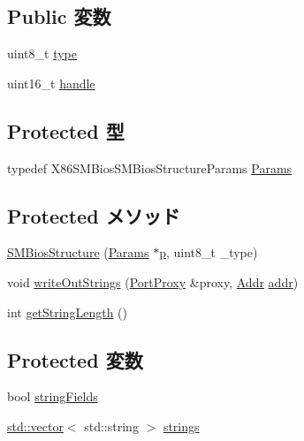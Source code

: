 \subsection*{Public 変数}
\begin{DoxyCompactItemize}
\item 
uint8\_\-t \hyperlink{classX86ISA_1_1SMBios_1_1SMBiosStructure_a1d127017fb298b889f4ba24752d08b8e}{type}
\item 
uint16\_\-t \hyperlink{classX86ISA_1_1SMBios_1_1SMBiosStructure_af242d6e3b6108ea75e1eb236e94c8240}{handle}
\end{DoxyCompactItemize}
\subsection*{Protected 型}
\begin{DoxyCompactItemize}
\item 
typedef X86SMBiosSMBiosStructureParams \hyperlink{classX86ISA_1_1SMBios_1_1SMBiosStructure_a55e55a28dd1c31e4bbc87e379625f1b5}{Params}
\end{DoxyCompactItemize}
\subsection*{Protected メソッド}
\begin{DoxyCompactItemize}
\item 
\hyperlink{classX86ISA_1_1SMBios_1_1SMBiosStructure_abcb5ae9a7643c8b6747e45af015dbe72}{SMBiosStructure} (\hyperlink{classX86ISA_1_1SMBios_1_1SMBiosStructure_a55e55a28dd1c31e4bbc87e379625f1b5}{Params} $\ast$\hyperlink{namespaceX86ISA_af675c1d542a25b96e11164b80809a856}{p}, uint8\_\-t \_\-type)
\item 
void \hyperlink{classX86ISA_1_1SMBios_1_1SMBiosStructure_ac064067fd8f527b9f81bbf3f851a173d}{writeOutStrings} (\hyperlink{classPortProxy}{PortProxy} \&proxy, \hyperlink{base_2types_8hh_af1bb03d6a4ee096394a6749f0a169232}{Addr} \hyperlink{namespaceX86ISA_ab705917f60c5566f9ce56a93f798b2e2}{addr})
\item 
int \hyperlink{classX86ISA_1_1SMBios_1_1SMBiosStructure_a0107eb1f73c5daf86f74ebc0a38e7467}{getStringLength} ()
\end{DoxyCompactItemize}
\subsection*{Protected 変数}
\begin{DoxyCompactItemize}
\item 
bool \hyperlink{classX86ISA_1_1SMBios_1_1SMBiosStructure_aa9458a1718dbd53456d513c7b8f0261e}{stringFields}
\item 
\hyperlink{classstd_1_1vector}{std::vector}$<$ std::string $>$ \hyperlink{classX86ISA_1_1SMBios_1_1SMBiosStructure_a0947426a73b52df3fb6348b3e72a1442}{strings}
\end{DoxyCompactItemize}


